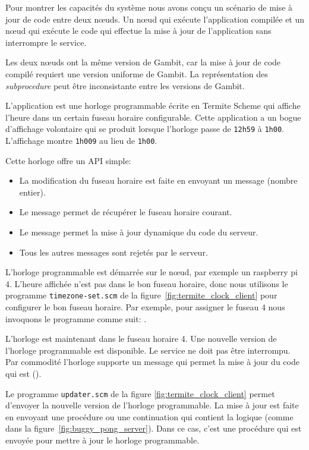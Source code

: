 Pour montrer les capacités du système nous avons conçu un scénario de mise à
jour de code entre deux nœuds. Un nœud qui exécute l'application compilée et un
nœud qui exécute le code qui effectue la mise à jour de l'application sans
interrompre le service.

Les deux nœuds ont la même version de Gambit, car la mise à jour de code
compilé requiert une version uniforme de Gambit. La représentation des
\textit{subprocedure} peut être inconsistante entre les versions de Gambit.

L'application est une horloge programmable écrite en Termite Scheme qui affiche
l'heure dans un certain fuseau horaire configurable. Cette application a un bogue
d'affichage volontaire qui se produit lorsque l'horloge passe de {\tt 12h59} à
{\tt 1h00}. L'affichage montre {\tt 1h009} au lieu de {\tt 1h00}.

Cette horloge offre un API simple:
\begin{itemize}
  \item La modification du fuseau horaire est faite en envoyant
    un message (nombre entier).

  \item Le message  permet de récupérer
    le fuseau horaire courant.

  \item Le message  permet la mise à jour
    dynamique du code du serveur.

  \item Tous les autres messages sont rejetés par le serveur.
\end{itemize}

L'horloge programmable est démarrée sur le nœud, par exemple un raspberry pi 4.
L'heure affichée n'est pas dans le bon fuseau horaire, donc nous utilisons
le programme \texttt{timezone-set.scm} de la figure~\ref{fig:termite_clock_client}
pour configurer le bon fuseau horaire. Par exemple, pour assigner le fuseau 4
nous invoquons le programme comme suit: .

L'horloge est maintenant dans le fuseau horaire 4. Une nouvelle version de
l'horloge programmable est disponible. Le service ne doit pas être interrompu.
Par commodité l'horloge supporte un message qui permet la mise à jour
du code qui est ().

Le programme \texttt{updater.scm} de la figure \ref{fig:termite_clock_client}
permet d'envoyer la nouvelle version de l'horloge programmable. La mise à jour
est faite en envoyant une procédure ou une continuation qui contient la logique
(comme dans la figure~\ref{fig:buggy_pong_server}). Dans ce cas, c'est une
procédure qui est envoyée pour mettre à jour le horloge programmable.

